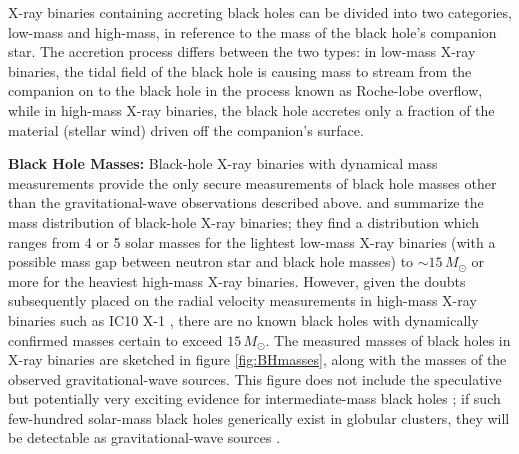\documentclass[iop,onecolumn]{revtex4-1}
\begin{document}
X-ray binaries containing accreting black holes can be divided into two categories, low-mass and high-mass, in reference to the mass of the black hole's companion star. The accretion process differs between the two types: in low-mass X-ray binaries, the tidal field of the black hole is causing mass to stream from the companion on to the black hole in the process known as Roche-lobe overflow, while in high-mass X-ray binaries, the black hole accretes only a fraction of the material (stellar wind) driven off the companion's surface.

\textbf{Black Hole Masses:} 
Black-hole X-ray binaries with dynamical mass measurements provide the only secure measurements of black hole masses other than the gravitational-wave observations described above.  \citet{Ozel:2010} and \citet{Farr:2011} summarize the mass distribution of black-hole X-ray binaries; they find a distribution which ranges from 4 or 5 solar masses for the lightest low-mass X-ray binaries (with a possible mass gap between neutron star and black hole masses) to $\sim 15\, M_\odot$ or more for the heaviest high-mass X-ray binaries.  However, given the doubts subsequently placed on the radial velocity measurements in high-mass X-ray binaries such as IC10 X-1 \citep{Laycock:2015}, there are no known black holes with dynamically confirmed masses certain to exceed $15\, M_\odot$.  The measured masses of black holes in X-ray binaries are sketched in figure \ref{fig:BHmasses}, along with the masses of the observed gravitational-wave sources.  This figure does not include the speculative but potentially very exciting evidence for intermediate-mass black holes \citep{MillerColbert:2004,Pasham:2014}; if such few-hundred solar-mass black holes generically exist in globular clusters, they will be detectable as gravitational-wave sources \citep[e.g.,][]{Mandel:2008,IMBBH:O1}.
\end{document}
